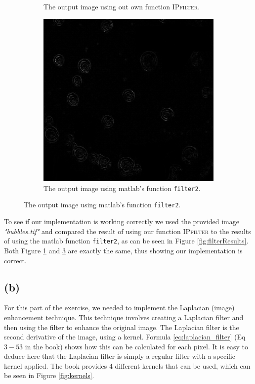 \documentclass{article}
\begin{document}
\begin{figure}[h]
\begin{subfigure}[t]{0.32\textwidth}
        \caption{The output image using out own function \textsc{IPfilter}.}
        \label{fig:filterKevin}
    \end{subfigure}
    \hfill
    \begin{subfigure}[t]{0.32\textwidth}
        \centering
        \includegraphics[width=\textwidth]{Assignment_1/output_images/filter_matlab.png}
        \caption{The output image using matlab's function \texttt{filter2}.}
        \label{fig:filterMatlab}
    \end{subfigure}
\end{figure}

To see if our implementation is working correctly we used the provided image \textit{"bubbles.tif"} and compared the result of using our function \textsc{IPfilter} to the results of using the matlab function \texttt{filter2}, as can be seen in Figure \ref{fig:filterResults}. Both Figure \ref{fig:filterKevin} and \ref{fig:filterMatlab} are exactly the same, thus showing our implementation is correct.

\subsection*{(b)}
For this part of the exercise, we needed to implement the Laplacian (image) enhancement technique. This technique involves creating a Laplacian filter and then using the filter to enhance the original image. The Laplacian filter is the second derivative of the image, using a kernel. Formula \ref{eq:laplacian_filter} (Eq $3-53$ in the book) shows how this can be calculated for each pixel. It is easy to deduce here that the Laplacian filter is simply a regular filter with a specific kernel applied. The book provides 4 different kernels that can be used, which can be seen in Figure \ref{fig:kernels}.
\end{document}
